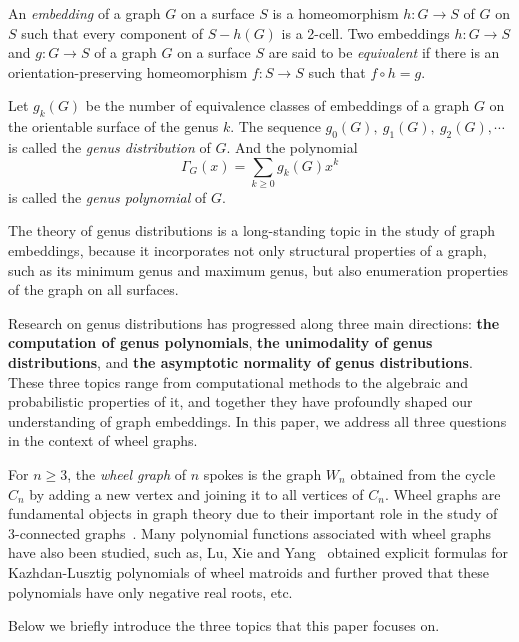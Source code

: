 \documentclass[12pt]{article}
\theoremstyle{definition}
\begin{document}
An {\it embedding} of a graph $G$ on a surface $S$ is a homeomorphism $h: G\rightarrow S$ of $G$ on $S$ such that every component of
$S-h(G)$ is a 2-cell. Two embeddings $h: G\rightarrow S$ and $g: G\rightarrow S$ of a graph $G$ on a surface $S$ are said to be {\it equivalent} if there is an orientation-preserving homeomorphism $f: S\rightarrow S$ such that $f\circ h=g.$

Let $g_{k}(G)$ be the number of equivalence classes of embeddings of a graph $G$ on the orientable surface of the genus $k$. The sequence $g_0(G),~g_1(G),~g_2(G),\cdots$
is called the {\it genus distribution} of $G$.  And  the polynomial $$\Gamma_{G}(x)=\sum\limits_{k\geq 0}g_{k}(G)x^{k}$$ is called the {\it genus polynomial} of $G$.

The theory of genus distributions is a long-standing topic in the study of graph embeddings, because it incorporates not only  structural properties of a graph, such as its minimum genus and maximum genus, but also enumeration properties of the graph on all surfaces.

Research on genus distributions has progressed along three main directions: \textbf{the computation of genus polynomials}, \textbf{the unimodality of genus distributions}, and \textbf{the asymptotic normality of genus distributions}. These three topics range from computational methods to the algebraic and probabilistic properties of it, and together they have profoundly shaped our understanding of graph embeddings. In this paper, we address all three questions in the context of wheel graphs.

For $n\geq 3$, the {\it wheel graph} of $n$ spokes is the graph $W_{n}$ obtained from the cycle $C_{n}$ by adding a new vertex and joining it to all vertices of $C_{n}$.  Wheel graphs are fundamental objects in graph theory due to their important role in the study of 3-connected graphs~\cite{Tutte1961}. Many polynomial functions associated with wheel graphs have also been studied, such as,
Lu, Xie and Yang~\cite{LXY2022} obtained explicit formulas for Kazhdan-Lusztig polynomials of wheel matroids and further proved that these polynomials have only negative real roots, etc.

Below we briefly introduce the three topics that this paper focuses on.
\end{document}
